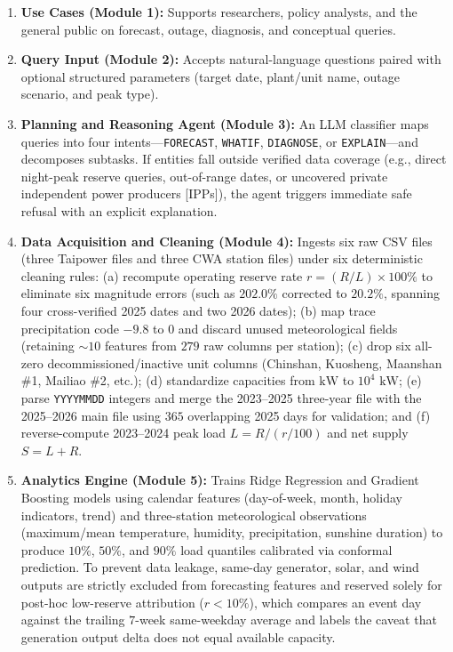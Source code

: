 \documentclass[conference]{IEEEtran}
\begin{document}
\begin{enumerate}
    \item \textbf{Use Cases (Module 1):} Supports researchers, policy analysts, and the general public on forecast, outage, diagnosis, and conceptual queries.
    \item \textbf{Query Input (Module 2):} Accepts natural-language questions paired with optional structured parameters (target date, plant/unit name, outage scenario, and peak type).
    \item \textbf{Planning and Reasoning Agent (Module 3):} An LLM classifier maps queries into four intents---\texttt{FORECAST}, \texttt{WHATIF}, \texttt{DIAGNOSE}, or \texttt{EXPLAIN}---and decomposes subtasks. If entities fall outside verified data coverage (e.g., direct night-peak reserve queries, out-of-range dates, or uncovered private independent power producers [IPPs]), the agent triggers immediate safe refusal with an explicit explanation.
    \item \textbf{Data Acquisition and Cleaning (Module 4):} Ingests six raw CSV files (three Taipower files and three CWA station files) under six deterministic cleaning rules: (a) recompute operating reserve rate $r = (R / L) \times 100\%$ to eliminate six magnitude errors (such as $202.0\%$ corrected to $20.2\%$, spanning four cross-verified 2025 dates and two 2026 dates); (b) map trace precipitation code $-9.8$ to $0$ and discard unused meteorological fields (retaining $\sim 10$ features from $279$ raw columns per station); (c) drop six all-zero decommissioned/inactive unit columns (Chinshan, Kuosheng, Maanshan \#1, Mailiao \#2, etc.); (d) standardize capacities from $\text{kW}$ to $10^4\text{ kW}$; (e) parse \texttt{YYYYMMDD} integers and merge the 2023--2025 three-year file with the 2025--2026 main file using $365$ overlapping 2025 days for validation; and (f) reverse-compute 2023--2024 peak load $L = R / (r/100)$ and net supply $S = L + R$.
    \item \textbf{Analytics Engine (Module 5):} Trains Ridge Regression and Gradient Boosting models using calendar features (day-of-week, month, holiday indicators, trend) and three-station meteorological observations (maximum/mean temperature, humidity, precipitation, sunshine duration) to produce $10\%$, $50\%$, and $90\%$ load quantiles calibrated via conformal prediction. To prevent data leakage, same-day generator, solar, and wind outputs are strictly excluded from forecasting features and reserved solely for post-hoc low-reserve attribution ($r < 10\%$), which compares an event day against the trailing $7$-week same-weekday average and labels the caveat that generation output delta does not equal available capacity.

\end{enumerate}
\end{document}
